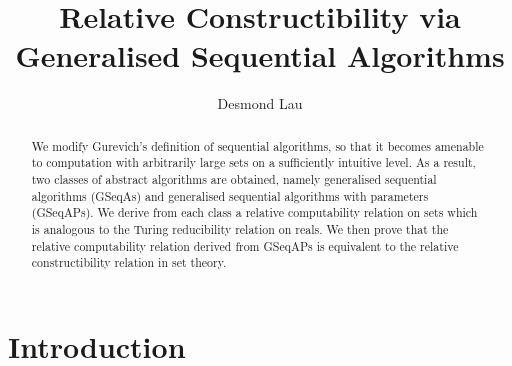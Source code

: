 \documentclass[12pt]{article}
\title{Relative Constructibility via Generalised Sequential Algorithms}
\author{Desmond Lau}
\numberwithin{equation}{section}
\begin{document}
\maketitle

\begin{abstract}
We modify Gurevich's definition of sequential algorithms, so that it becomes amenable to computation with arbitrarily large sets on a sufficiently intuitive level. As a result, two classes of abstract algorithms are obtained, namely generalised sequential algorithms (GSeqAs) and generalised sequential algorithms with parameters (GSeqAPs). We derive from each class a relative computability relation on sets which is analogous to the Turing reducibility relation on reals. We then prove that the relative computability relation derived from GSeqAPs is equivalent to the relative constructibility relation in set theory.
\end{abstract}

\newtheorem{thm}{Theorem}[section]
\newtheorem{innercustomlem}{Lemma}
\newenvironment{customlem}[1]
  {\renewcommand\theinnercustomlem{#1}\innercustomlem}
  {\endinnercustomlem}
\newtheorem{innercustomdef}{Definition}
\newenvironment{customdef}[1]
  {\renewcommand\theinnercustomdef{#1}\innercustomdef}
  {\endinnercustomdef}
\newtheorem{lem}[thm]{Lemma}
\newtheorem{prop}[thm]{Proposition}
\newtheorem{cor}[thm]{Corollary}
\newtheorem{conj}[thm]{Conjecture}
\newtheorem{ques}[thm]{Question}
\newtheorem*{claim}{Claim}
\newtheorem{claim2}[thm]{Claim}
\theoremstyle{definition}
\newtheorem{defi}[thm]{Definition}
\theoremstyle{remark}
\newtheorem*{rem*}{Remark}
\newtheorem{rem}[thm]{Remark}
\newtheorem{ex}[thm]{Example}
\newtheorem{ob}[thm]{Observation}
\newtheorem{fact}[thm]{Fact}
\newtheorem{con}[thm]{Convention}
\newtheorem{diff}[thm]{Difficulty}

\newcommand{\bd}[1]{\mathbf{#1}}  %
\newcommand{\RR}{\mathbb{R}}      %
\newcommand{\ZZ}{\mathbb{Z}}      %
\newcommand{\col}[1]{\left[\begin{matrix} #1 \end{matrix} \right]}
\newcommand{\comb}[2]{\binom{#1^2 + #2^2}{#1+#2}}
\newcommand{\eq}{=}

\newcommand{\blankpage}{
\newpage
\thispagestyle{empty}
\mbox{}
\newpage
}

{\let\clearpage\relax \tableofcontents} 
\thispagestyle{empty}

\section{Introduction}\label{sect1}
\end{document}
